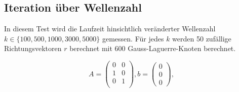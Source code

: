\subsection{Iteration über Wellenzahl}


In diesem Test wird die Laufzeit hinsichtlich veränderter Wellenzahl $k \in \{ 100, 500, 1000, 3000, 5000 \}$ gemessen.
Für jedes $k$ werden 50 zufällige Richtungsvektoren $r$ berechnet mit 600 Gauss-Laguerre-Knoten berechnet.

\begin{equation}
  A = \begin{pmatrix}
      0 & 0 \\
      1 & 0 \\
      0 & 1 \\
  \end{pmatrix}, b = \begin{pmatrix}
      0 \\ 0\\ 0
  \end{pmatrix},
\end{equation}

